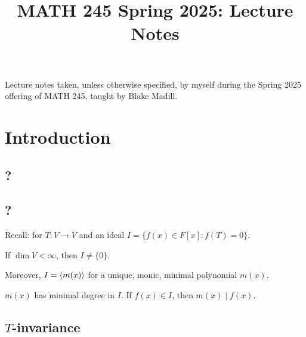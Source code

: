 \documentclass[notes,tikz]{agony}
\title{MATH 245 Spring 2025: Lecture Notes}
\begin{document}
\renewcommand{\contentsname}{MATH 245 Spring 2025:\\{\huge Lecture Notes}}
\thispagestyle{firstpage}
\tableofcontents

Lecture notes taken, unless otherwise specified,
by myself during the Spring 2025 offering of MATH 245,
taught by Blake Madill.

\begin{multicols}{2}
  \listoflecture
\end{multicols}

\chapter{Introduction}
\section{?}
\section{?}

Recall: for $T : V \to V$
and an ideal $I = \{f(x) \in F[x] : f(T) = 0 \}$.
\begin{fact}\label{fact:f1}
  If $\dim V < \infty$, then $I \neq \{0\}$.

  Moreover, $I = \ev{m(x)}$
  for a unique, monic, minimal polynomial $m(x)$.
\end{fact}
\begin{remark}
  $m(x)$ has minimal degree in $I$.
  If $f(x) \in I$, then $m(x) \mid f(x)$.
\end{remark}

\section{$T$-invariance}
\end{document}
